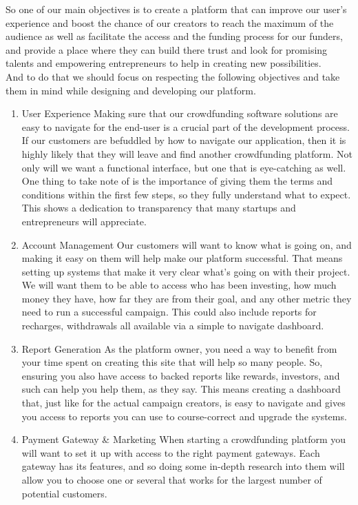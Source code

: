 So one of our main objectives is to create a platform that can improve our user's experience and boost the chance of our creators to reach the maximum of the audience as well as facilitate the access and the funding process for our funders, and provide a place where they can build there trust and look for promising talents and empowering entrepreneurs to help in creating new possibilities.\\
And to do that we should focus on respecting the following objectives and take them in mind while designing and developing our platform.
\begin{enumerate}
      \item
            User Experience
            Making sure that our crowdfunding software solutions are easy to navigate for the end-user is a crucial part of the development process. If our customers are befuddled by how to navigate our application, then it is highly likely that they will leave and find another crowdfunding platform. Not only will we want a functional interface, but one that is eye-catching as well.
            One thing to take note of is the importance of giving them the terms and conditions within the first few steps, so they fully understand what to expect. This shows a dedication to transparency that many startups and entrepreneurs will appreciate.

      \item
            Account Management
            Our customers will want to know what is going on, and making it easy on them will help make our platform successful. That means setting up systems that make it very clear what’s going on with their project. We will want them to be able to access who has been investing, how much money they have, how far they are from their goal, and any other metric they need to run a successful campaign. This could also include reports for recharges, withdrawals all available via a simple to navigate dashboard.
      \item

            Report Generation
            As the platform owner, you need a way to benefit from your time spent on creating this site that will help so many people. So, ensuring you also have access to backed reports like rewards, investors, and such can help you help them, as they say. This means creating a dashboard that, just like for the actual campaign creators, is easy to navigate and gives you access to reports you can use to course-correct and upgrade the systems.
      \item
            Payment Gateway \& Marketing
            When starting a crowdfunding platform you will want to set it up with access to the right payment gateways. Each gateway has its features, and so doing some in-depth research into them will allow you to choose one or several that works for the largest number of potential customers.
\end{enumerate}



